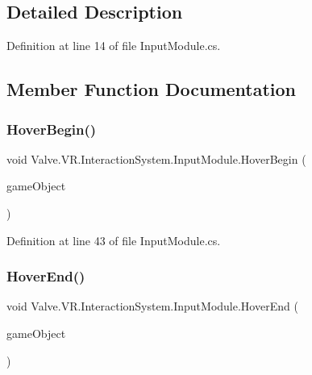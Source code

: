 \subsection{Detailed Description}


Definition at line 14 of file Input\+Module.\+cs.



\subsection{Member Function Documentation}
\mbox{\label{class_valve_1_1_v_r_1_1_interaction_system_1_1_input_module_a516437e1ea7801b815b59a5bda77bd0e}} 
\subsubsection{\texorpdfstring{HoverBegin()}{HoverBegin()}}
{\footnotesize\ttfamily void Valve.\+V\+R.\+Interaction\+System.\+Input\+Module.\+Hover\+Begin (\begin{DoxyParamCaption}\item[{Game\+Object}]{game\+Object }\end{DoxyParamCaption})}



Definition at line 43 of file Input\+Module.\+cs.

\mbox{\label{class_valve_1_1_v_r_1_1_interaction_system_1_1_input_module_a0a8f8a7133b5e1d79fcd9687d48ce42d}} 
\subsubsection{\texorpdfstring{HoverEnd()}{HoverEnd()}}
{\footnotesize\ttfamily void Valve.\+V\+R.\+Interaction\+System.\+Input\+Module.\+Hover\+End (\begin{DoxyParamCaption}\item[{Game\+Object}]{game\+Object }\end{DoxyParamCaption})}




